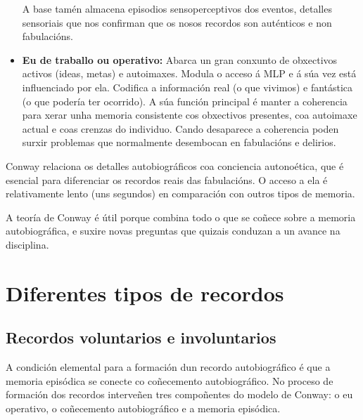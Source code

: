 \documentclass[a4paper,11pt]{article}
\begin{document}
\begin{itemize}
	A base tamén almacena episodios sensoperceptivos dos eventos, detalles sensoriais que nos
	confirman que os nosos recordos son auténticos e non fabulacións. 
	\item \textbf{Eu de traballo ou operativo:} Abarca un gran conxunto de obxectivos activos 
	(ideas, metas) e autoimaxes. Modula o acceso á MLP e á súa vez está influenciado por ela. 
	Codifica a información real (o que vivimos) e fantástica (o que podería ter ocorrido). A súa   
	función principal é manter a coherencia para xerar unha memoria consistente cos obxectivos
	presentes, coa autoimaxe actual e coas crenzas do individuo. Cando desaparece a coherencia poden
	surxir problemas que normalmente desembocan en fabulacións e delirios.
\end{itemize}

Conway relaciona os detalles autobiográficos coa conciencia autonoética, que é esencial para diferenciar os recordos reais das fabulacións. O acceso a ela é relativamente lento (uns segundos) en comparación con outros tipos de memoria.

A teoría de Conway é útil porque combina todo o que se coñece sobre a memoria autobiográfica, e suxire novas preguntas que quizais conduzan a un avance na disciplina.

\section{Diferentes tipos de recordos}
\subsection{Recordos voluntarios e involuntarios}
A condición elemental para a formación dun recordo autobiográfico é que a memoria episódica se conecte co coñecemento autobiográfico. No proceso de formación dos recordos interveñen tres compoñentes do modelo de Conway: o eu operativo, o coñecemento autobiográfico e a memoria episódica.
\end{document}
